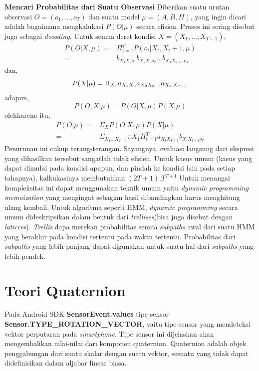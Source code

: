 \textbf{Mencari Probabilitas dari Suatu Observasi}
\cite{manning1999natural} 
Diberikan suatu urutan observasi \(O = (o_1,...,o_T)\) dan suatu model \(\mu = (A,B,II)\), yang ingin dicari adalah bagaimana mengkalukasi \(P(O|\mu )\) secara efisien. Proses ini sering disebut juga sebagai \textit{decoding}. Untuk semua deret kondisi \(X = (X_1,...,X_{T+1})\),
\begin{align*}
	P(O|X,\mu ) =& \Pi^{T}_{t=1} P(o_t|X_t,X_t+1,\mu )\\
		=& b_{X_1 X_2 o_1}b_{X_2 X_3 o_2}... b_{X_T X_{T+1}o_T}
\end{align*}
dan, 
\[
	P(X|\mu ) = \Pi_{X_1}a_{X_1 X_2}a_{X_2 X_3}...a_{X_T X_{T+1}}\\
\]
adapun,
\[
	P(O,X|\mu ) = P(O|X,\mu ) P(X|\mu )
\]
olehkarena itu, 
\begin{align*}
	P(O|\mu ) =& \Sigma_X P(O|X,\mu ) P(X|\mu )\\
	=& \Sigma_{X_1 ...X_{T+1}} \pi X_1 \Pi^{T}_{t=1} a_{X_t X_{T+1}}b_{X_t X_{t+1}o_T}
\end{align*}
\cite{manning1999natural} 
Penurunan ini cukup terang-terangan. Sayangnya, evaluasi langsung dari ekspresi yang dihasilkan tersebut sangatlah tidak efisien. Untuk kasus umum (kasus yang dapat dimulai pada kondisi apapun, dan pindah ke kondisi lain pada setiap tahapnya), kalkukasinya membutuhkan \((2T+1).T^{T+1}\) Untuk menangai kompleksitas ini dapat menggunakan teknik umum yaitu \textit{dynamic programming memoization} yang mengingat sebagian hasil dibandingkan harus menghitung ulang kembali. Untuk algoritma seperti HMM, \textit{dynamic programming} secara umum dideskripsikan dalam bentuk dari \textit{trellises}(bisa juga disebut dengan \textit{laticces}). \textit{Trellis} dapa merekan probabilitas semua \textit{subpaths} awal dari suatu HMM yang berakhir pada kondisi tertentu pada waktu tertentu. Probabilitas dari \textit{subpaths} yang lebih panjang dapat digunakan untuk suatu hal dari \textit{subpaths} yang lebih pendek.
\section{Teori Quaternion}
\label{sec:teori_quaternion}

Pada Android SDK \textbf{SensorEvent.values} \cite{android_developers} tipe sensor \textbf{Sensor.TYPE\_ROTATION\_VECTOR}, yaitu tipe sensor yang mendeteksi vektor perputaran pada \textit{smartphone}. Tipe sensor ini dijelaskan akan mengembalikan nilai-nilai dari komponen quaternion. 
Quaternion\cite{kuipers:1999} adalah objek penggabungan dari suatu skalar dengan suatu vektor, sesuatu yang tidak dapat didefinisikan dalam aljabar linear biasa. 

